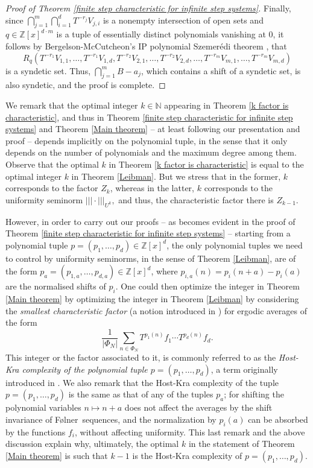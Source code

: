 \documentclass[reqno]{amsart}
\def\Z{{\mathbb Z}}
\def\N{{\mathbb N}}
\newcommand{\nnorm}[1]{\lvert\!|\!| #1|\!|\!\rvert}
\theoremstyle{definition}
\theoremstyle{remark}
\def\N{{\mathbb N}}
\newcommand{\Folner}{F\o{}lner}
\begin{document}
\begin{proof}[Proof of Theorem \ref{finite step characteristic for infinite step systems}]
Finally, since 
$\bigcap_{j=1}^m \bigcap_{i=1}^d T^{-r_j}V_{j,i}$ is a nonempty intersection of open sets and $q\in \Z[x]^{d\cdot m}$ is a tuple of essentially distinct polynomials vanishing at $0$, it follows by Bergelson-McCutcheon's IP polynomial Szemer\'edi theorem \cite[Lemma 6.12]{Bergelson_McCutcheon00}, that 
$$R_q (T^{-r_1}V_{1,1},\ldots,T^{-r_1}V_{1,d},T^{-r_2}V_{2,1},\ldots,T^{-r_2}V_{2,d},\ldots,T^{-r_m}V_{m,1},\ldots,T^{-r_m}V_{m,d})$$
is a syndetic set. Thus, $\bigcap_{j=1}^m B-a_j$, which 
contains a shift of a syndetic set, is also syndetic, and the 
proof is complete. 
\end{proof}


We remark that the optimal integer $k\in \N$ 
appearing in Theorem \ref{k factor is characteristic}, and 
thus in Theorem 
\ref{finite step characteristic for infinite step systems} and Theorem \ref{Main theorem} -- at least following our presentation and 
proof -- depends implicitly on the polynomial tuple, in the 
sense that it only depends on the number of 
polynomials and the maximum degree among them. Observe that 
the optimal $k$ in Theorem \ref{k factor is characteristic} 
is equal to the optimal integer $k$ in 
Theorem \ref{Leibman}. But we stress that in the former, $k$ corresponds to the factor $Z_k$, whereas in the latter, $k$ corresponds to the uniformity seminorm $\nnorm{ \cdot }_{U^k},$ and thus, the characteristic factor there is $Z_{k-1}$.

However, in order to carry out our proofs -- as
becomes evident in the proof of Theorem \ref{finite step characteristic for infinite step systems} -- starting from a polynomial tuple $p=(p_1,\ldots,p_d)\in \Z[x]^d$, the only polynomial tuples we need to control by 
uniformity seminorms, in the sense of Theorem \ref{Leibman}, 
are of the form $p_a=(p_{1,a},\ldots,p_{d,a})\in \Z[x]^d$, 
where $p_{i,a}(n)=p_i(n+a)-p_i(a)$ are the normalised shifts 
of $p_i$. 
One could then optimize the integer in Theorem \ref{Main theorem} by optimizing the 
integer in Theorem \ref{Leibman} by considering the \textit{smallest characteristic factor} (a notion introduced in \cite{Fur_Weiss_96}) 
for ergodic averages of the form 
$$\frac{1}{|\Phi_N|}\sum_{n\in \Phi_N} T^{p_1(n)}f_1 \cdots T^{p_d(n)}f_d.$$
This integer or the factor associated to it, is 
commonly referred to as the 
\textit{Host-Kra complexity of the polynomial tuple $p=(p_1,\ldots,p_d)$}, a term originally introduced in \cite{Bergelson_Leibman_Lesigne}. We also remark that the 
Host-Kra complexity of the tuple $p=(p_1,\ldots,p_d)$ is the 
same as that of any of the tuples $p_{a}$; for shifting 
the polynomial variables $n\mapsto n+a$ does not affect the 
averages by the shift invariance of 
\Folner\ sequences, and the normalization by $p_i(a)$ can be 
absorbed by the functions $f_i$, without affecting 
uniformity. This last remark and the above discussion 
explain why, ultimately, the optimal $k$ in the statement of 
Theorem \ref{Main theorem} is such that $k-1$ is the Host-Kra 
complexity of $p=(p_1,\ldots,p_d)$. 
\end{document}
